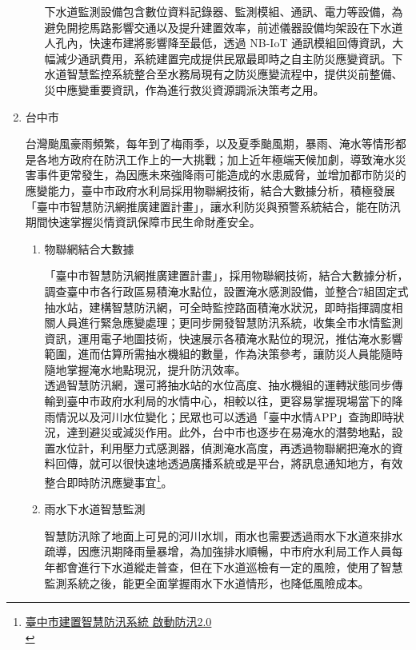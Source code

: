 \documentclass[a4paper,12pt]{article}
\begin{document}
\begin{enumerate}
\begin{enumerate}
下水道監測設備包含數位資料記錄器、監測模組、通訊、電力等設備，為避免開挖馬路影響交通以及提升建置效率，前述儀器設備均架設在下水道人孔內，快速布建將影響降至最低，透過 NB-IoT 通訊模組回傳資訊，大幅減少通訊費用，系統建置完成提供民眾最即時之自主防災應變資訊。下水道智慧監控系統整合至水務局現有之防災應變流程中，提供災前整備、災中應變重要資訊，作為進行救災資源調派決策考之用。\\
\end{enumerate}

\item 台中市
\label{sec:org39f16b3}

台灣颱風豪雨頻繁，每年到了梅雨季，以及夏季颱風期，暴雨、淹水等情形都是各地方政府在防汛工作上的一大挑戰；加上近年極端天候加劇，導致淹水災害事件更常發生，為因應未來強降雨可能造成的水患威脅，並增加都市防災的應變能力，臺中市政府水利局採用物聯網技術，結合大數據分析，積極發展「臺中市智慧防汛網推廣建置計畫」，讓水利防災與預警系統結合，能在防汛期間快速掌握災情資訊保障市民生命財產安全。\\
\begin{enumerate}
\item 物聯網結合大數據
\label{sec:org69e8bad}

「臺中市智慧防汛網推廣建置計畫」，採用物聯網技術，結合大數據分析，調查臺中市各行政區易積淹水點位，設置淹水感測設備，並整合7組固定式抽水站，建構智慧防汛網，可全時監控路面積淹水狀況，即時指揮調度相關人員進行緊急應變處理；更同步開發智慧防汛系統，收集全市水情監測資訊，運用電子地圖技術，快速展示各積淹水點位的現況，推估淹水影響範圍，進而估算所需抽水機組的數量，作為決策參考，讓防災人員能隨時隨地掌握淹水地點現況，提升防汛效率。\\

透過智慧防汛網，還可將抽水站的水位高度、抽水機組的運轉狀態同步傳輸到臺中市政府水利局的水情中心，相較以往，更容易掌握現場當下的降雨情況以及河川水位變化；民眾也可以透過「臺中水情APP」查詢即時狀況，達到避災或減災作用。此外，台中市也逐步在易淹水的潛勢地點，設置水位計，利用壓力式感測器，偵測淹水高度，再透過物聯網把淹水的資料回傳，就可以很快速地透過廣播系統或是平台，將訊息通知地方，有效整合即時防汛應變事宜\footnote{\href{https://news.cts.com.tw/cts/general/202004/202004171997574.html}{臺中市建置智慧防汛系統 啟動防汛2.0}\\}。\\
\item 雨水下水道智慧監測
\label{sec:orge391534}

智慧防汛除了地面上可見的河川水圳，雨水也需要透過雨水下水道來排水疏導，因應汛期降雨量暴增，為加強排水順暢，中市府水利局工作人員每年都會進行下水道縱走普查，但在下水道巡檢有一定的風險，使用了智慧監測系統之後，能更全面掌握雨水下水道情形，也降低風險成本。\\


\end{enumerate}
\end{enumerate}
\end{document}

